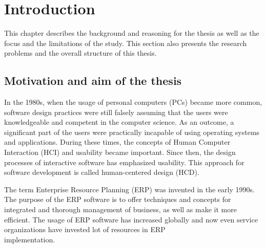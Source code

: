 \documentclass[12pt,a4paper,oneside,pdftex]{report}
\begin{document}

\label{pages-prelude}
\cleardoublepage

\startfirstchapter

\pagestyle{headings}


% 

\chapter{Introduction}
\label{chapter:introduction}
This chapter describes the background and reasoning for the thesis as well as the focus and the limitations of the study. This section also presents the research problems and the overall structure of this thesis. 

\section{Motivation and aim of the thesis}
\label{sec:motivationandaim}
In the 1980s, when the usage of personal computers (PCs) became more common, software design practices were still falsely assuming that the users were knowledgeable and competent in the computer science. As an outcome, a significant part of the users were practically incapable of using operating systems and applications. During these times, the concepts of Human Computer Interaction (HCI) and usability became important. Since then, the design processes of interactive software has emphasized usability. This approach for software development is called human-centered design (HCD). \cite{RefWorks:9}

The term Enterprise Resource Planning (ERP) was invented in the early 1990s.\cite{RefWorks:3} The purpose of the ERP software is to offer techniques and concepts for integrated and thorough management of business, as well as make it more efficient.
The usage of ERP software has increased globally and now even service organizations have invested lot of resources in ERP \\  implementation.\cite{RefWorks:1, RefWorks:7} 
\end{document}
